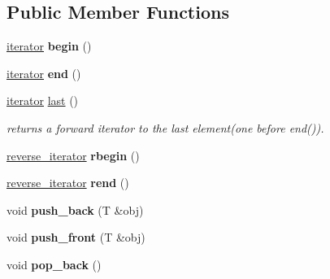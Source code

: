\subsection*{Public Member Functions}
\begin{DoxyCompactItemize}
\item 
\hypertarget{classIntrusiveList_a336cc31d72aa71a54ae03d0041bed225}{}\hyperlink{structIntrusiveList_1_1iterator}{iterator} {\bfseries begin} ()\label{classIntrusiveList_a336cc31d72aa71a54ae03d0041bed225}

\item 
\hypertarget{classIntrusiveList_afa4b078624ef59abf461fb0985bfa840}{}\hyperlink{structIntrusiveList_1_1iterator}{iterator} {\bfseries end} ()\label{classIntrusiveList_afa4b078624ef59abf461fb0985bfa840}

\item 
\hypertarget{classIntrusiveList_a0c0857a3e1a7fb32b4ce36ad25a49b6f}{}\hyperlink{structIntrusiveList_1_1iterator}{iterator} \hyperlink{classIntrusiveList_a0c0857a3e1a7fb32b4ce36ad25a49b6f}{last} ()\label{classIntrusiveList_a0c0857a3e1a7fb32b4ce36ad25a49b6f}

\begin{DoxyCompactList}\small\item\em returns a forward iterator to the last element(one before end()). \end{DoxyCompactList}\item 
\hypertarget{classIntrusiveList_aa3c78a96b6ee696d5e7ae4e917d13793}{}\hyperlink{structIntrusiveList_1_1reverse__iterator}{reverse\+\_\+iterator} {\bfseries rbegin} ()\label{classIntrusiveList_aa3c78a96b6ee696d5e7ae4e917d13793}

\item 
\hypertarget{classIntrusiveList_ab065d0b937dc9cc61a7d2fad9145bb4b}{}\hyperlink{structIntrusiveList_1_1reverse__iterator}{reverse\+\_\+iterator} {\bfseries rend} ()\label{classIntrusiveList_ab065d0b937dc9cc61a7d2fad9145bb4b}

\item 
\hypertarget{classIntrusiveList_a4ce874e13f50d78ef3938a131a0d2e07}{}void {\bfseries push\+\_\+back} (T \&obj)\label{classIntrusiveList_a4ce874e13f50d78ef3938a131a0d2e07}

\item 
\hypertarget{classIntrusiveList_a04263b1edddb7540730265e37df2d1e7}{}void {\bfseries push\+\_\+front} (T \&obj)\label{classIntrusiveList_a04263b1edddb7540730265e37df2d1e7}

\item 
\hypertarget{classIntrusiveList_aba2254407f426a97c33d2b12ee89c76d}{}void {\bfseries pop\+\_\+back} ()\label{classIntrusiveList_aba2254407f426a97c33d2b12ee89c76d}


\end{DoxyCompactItemize}
